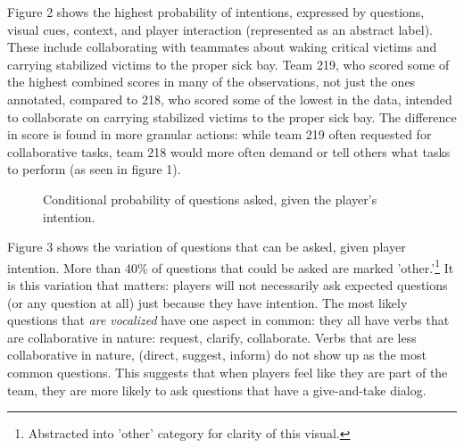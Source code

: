 Figure 2 shows the highest probability of intentions, expressed by questions, visual cues, context, and player interaction (represented as an abstract label). These include collaborating with teammates about waking critical victims and carrying stabilized victims to the proper sick bay. Team 219, who scored some of the highest combined scores in many of the observations, not just the ones annotated, compared to 218, who scored some of the lowest in the data, intended to collaborate on carrying stabilized victims to the proper sick bay. The difference in score is found in more granular actions: while team 219 often requested for collaborative tasks, team 218 would more often demand or tell others what tasks to perform (as seen in figure 1).


\begin{figure}[h!]
    \centering
    \caption{Conditional probability of questions asked, given the player's intention.}
\end{figure}

Figure 3 shows the variation of questions that can be asked, given player intention. More than 40\% of questions that could be asked are marked 'other.'\footnote{Abstracted into 'other' category for clarity of this visual.} It is this variation that matters: players will not necessarily ask expected questions (or any question at all) just because they have intention. The most likely questions that \emph{are vocalized} have one aspect in common: they all have verbs that are collaborative in nature: request, clarify, collaborate. Verbs that are less collaborative in nature, (direct, suggest, inform) do not show up as the most common questions. This suggests that when players feel like they are part of the team, they are more likely to ask questions that have a give-and-take dialog.


